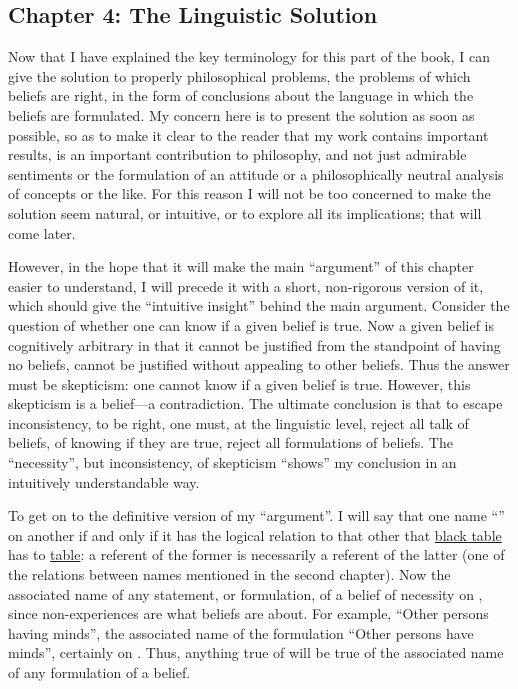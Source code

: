 \subsection[Chapter 4: The Linguistic Solution][The Linguistic Solution]{Chapter 4: The Linguistic Solution}

Now that I have explained the key terminology for this part of the book, I can give the solution to properly philosophical problems, the problems of which beliefs are right, in the form of conclusions about the language in which the beliefs are formulated. My concern here is to present the solution as soon as possible, so as to make it clear to the reader that my work contains important results, is an important contribution to philosophy, and not just admirable sentiments or the formulation of an attitude or a philosophically neutral analysis of concepts or the like. For this reason I will not be too concerned to make the solution seem natural, or intuitive, or to explore all its implications; that will come later. 

However, in the hope that it will make the main \enquote{argument} of this chapter easier to understand, I will precede it with a short, non-rigorous version of it, which should give the \enquote{intuitive insight} behind the main argument. Consider the question of whether one can know if a given belief is true. Now a given belief is cognitively arbitrary in that it cannot be justified from the standpoint of having no beliefs, cannot be justified without appealing to other beliefs. Thus the answer must be skepticism: one cannot know if a given belief is true. However, this skepticism is a belief---a contradiction. The ultimate conclusion is that to escape inconsistency, to be right, one must, at the linguistic level, reject all talk of beliefs, of knowing if they are true, reject all formulations of beliefs. The \enquote{necessity}, but inconsistency, of skepticism \enquote{shows} my conclusion in an intuitively understandable way. 

To get on to the definitive version of my \enquote{argument}. I will say that one name \enquote{} on another if and only if it has the logical relation to that other that \uline{black table} has to \uline{table}: a referent of the former is necessarily a referent of the latter (one of the relations between names mentioned in the second chapter). Now the associated name of any statement, or formulation, of a belief of necessity  on , since non-experiences are what beliefs are about. For example, \enquote{Other persons having minds}, the associated name of the formulation \enquote{Other persons have minds}, certainly  on . Thus, anything true of  will be true of the associated name of any formulation of a belief. 

